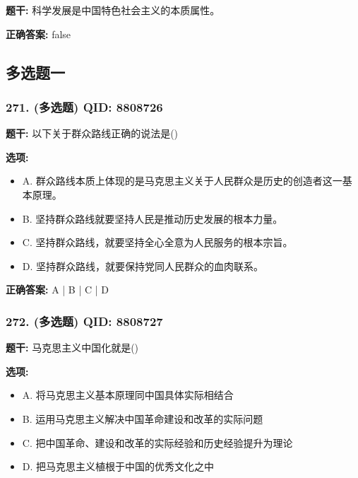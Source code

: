 \documentclass[12pt,UTF8]{ctexart}
\begin{document}
\textbf{题干:}
科学发展是中国特色社会主义的本质属性。

\textbf{正确答案:}
false

\vspace{0.3em}\hrulefill\vspace{0.7em}

\subsection*{多选题一}

\subsubsection*{271. (多选题) \small QID: 8808726}

\textbf{题干:}
以下关于群众路线正确的说法是()

\textbf{选项:}
\begin{itemize}[leftmargin=*]

  \item A. 群众路线本质上体现的是马克思主义关于人民群众是历史的创造者这一基本原理。

  \item B. 坚持群众路线就要坚持人民是推动历史发展的根本力量。

  \item C. 坚持群众路线，就要坚持全心全意为人民服务的根本宗旨。

  \item D. 坚持群众路线，就要保持党同人民群众的血肉联系。

\end{itemize}

\textbf{正确答案:}
A | B | C | D

\vspace{0.3em}\hrulefill\vspace{0.7em}

\subsubsection*{272. (多选题) \small QID: 8808727}

\textbf{题干:}
马克思主义中国化就是()

\textbf{选项:}
\begin{itemize}[leftmargin=*]

  \item A. 将马克思主义基本原理同中国具体实际相结合

  \item B. 运用马克思主义解决中国革命建设和改革的实际问题

  \item C. 把中国革命、建设和改革的实际经验和历史经验提升为理论

  \item D. 把马克思主义植根于中国的优秀文化之中

\end{itemize}
\end{document}
